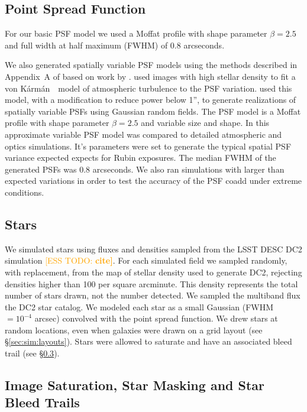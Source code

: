\documentclass[twocolumn,twocolappendix,astrosym]{openjournal}
\newcommand{\esstodo}[1]{\textcolor{orange}{[ESS TODO: \bf #1]}}
\newcommand{\vonkarman}{{von K\'arm\'an}~}
\begin{document}
\subsection{Point Spread Function} \label{sec:sim:psfs}

For our basic PSF model we used a Moffat profile \citep{Moffat1969} with
shape parameter $\beta=2.5$ and full width at half maximum (FWHM) of 0.8 arcseconds.

We also generated spatially variable PSF models using the methods described in
Appendix~A of \citet{mdet20} based on work by \citet{heymans2012}.
\citet{heymans2012} used images with high stellar density to fit a \vonkarman\
model of atmospheric turbulence to the PSF variation. \citet{mdet20}
used this model, with a modification to reduce power below 1'', to generate
realizations of spatially variable PSFs using Gaussian random fields. The PSF
model is a Moffat \citep{Moffat1969} profile with shape parameter $\beta=2.5$
and variable size and shape. In \citet{mdet20} this approximate
variable PSF model was compared to detailed atmospheric and optics simulations.
It's parameters were set to generate the typical spatial PSF variance expected
expects for Rubin exposures. The median FWHM of the generated PSFs was 0.8
arcseconds.  We also ran simulations with larger than expected variations in
order to test the accuracy of the PSF coadd under extreme conditions.

\subsection{Stars} \label{sec:sim:stars}

We simulated stars using fluxes and densities sampled from the LSST DESC DC2
simulation \esstodo{cite}.  For each simulated field we sampled randomly, with
replacement, from the map of stellar density used to generate DC2, rejecting
densities higher than 100 per square arcminute.  This density represents
the total number of stars drawn, not the number detected.  We
sampled the multiband flux the DC2 star catalog.  We modeled
each star as a small Gaussian (FWHM $= 10^{-4}$ arcsec) convolved with the
point spread function.  We drew stars at random locations, even when galaxies
were drawn on a grid layout (see \S \ref{sec:sim:layouts}).  Stars were allowed
to saturate and have an associated bleed trail (see
\S \ref{sec:sim:satbleeds}).

\subsection{Image Saturation, Star Masking and Star Bleed Trails} \label{sec:sim:satbleeds}
\end{document}
